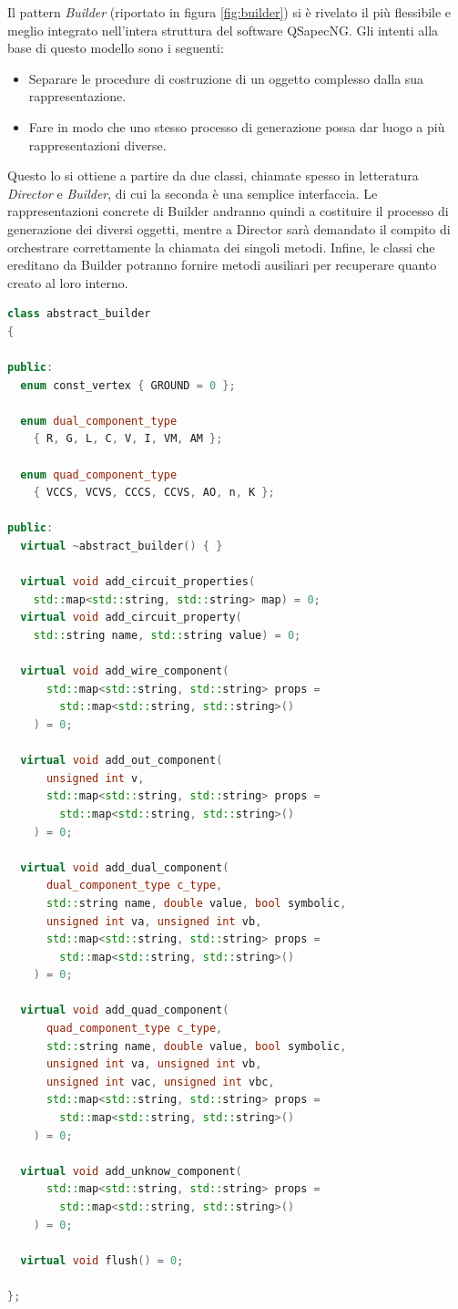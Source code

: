 Il pattern \textit{Builder} (riportato in figura \ref{fig:builder}) si è rivelato il più flessibile e meglio integrato nell'intera struttura del software QSapecNG. Gli intenti alla base di questo modello sono i seguenti:
\begin{itemize}
 \item Separare le procedure di costruzione di un oggetto complesso dalla sua rappresentazione.
 \item Fare in modo che uno stesso processo di generazione possa dar luogo a più rappresentazioni diverse.
\end{itemize}
Questo lo si ottiene a partire da due classi, chiamate spesso in letteratura \textit{Director} e \textit{Builder}, di cui la seconda è una semplice interfaccia. Le rappresentazioni concrete di Builder andranno quindi a costituire il processo di generazione dei diversi oggetti, mentre a Director sarà demandato il compito di orchestrare correttamente la chiamata dei singoli metodi. Infine, le classi che ereditano da Builder potranno fornire metodi ausiliari per recuperare quanto creato al loro interno.

\begin{lstlisting}[basicstyle=\small,language=C++,caption={Builder in QSapecNG},float,label={lst:builder},captionpos=b,frame=lines]
class abstract_builder
{

public:
  enum const_vertex { GROUND = 0 };

  enum dual_component_type
    { R, G, L, C, V, I, VM, AM };

  enum quad_component_type
    { VCCS, VCVS, CCCS, CCVS, AO, n, K };

public:
  virtual ~abstract_builder() { }

  virtual void add_circuit_properties(
    std::map<std::string, std::string> map) = 0;
  virtual void add_circuit_property(
    std::string name, std::string value) = 0;

  virtual void add_wire_component(
      std::map<std::string, std::string> props =
        std::map<std::string, std::string>()
    ) = 0;

  virtual void add_out_component(
      unsigned int v,
      std::map<std::string, std::string> props =
        std::map<std::string, std::string>()
    ) = 0;

  virtual void add_dual_component(
      dual_component_type c_type,
      std::string name, double value, bool symbolic,
      unsigned int va, unsigned int vb,
      std::map<std::string, std::string> props =
        std::map<std::string, std::string>()
    ) = 0;

  virtual void add_quad_component(
      quad_component_type c_type,
      std::string name, double value, bool symbolic,
      unsigned int va, unsigned int vb,
      unsigned int vac, unsigned int vbc,
      std::map<std::string, std::string> props =
        std::map<std::string, std::string>()
    ) = 0;

  virtual void add_unknow_component(
      std::map<std::string, std::string> props =
        std::map<std::string, std::string>()
    ) = 0;

  virtual void flush() = 0;

};
\end{lstlisting}


